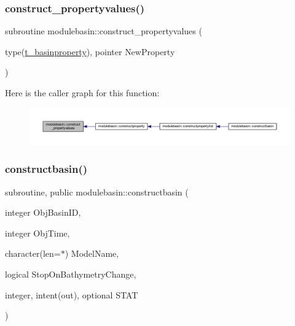 \subsubsection{\texorpdfstring{construct\+\_\+propertyvalues()}{construct\_propertyvalues()}}
{\footnotesize\ttfamily subroutine modulebasin\+::construct\+\_\+propertyvalues (\begin{DoxyParamCaption}\item[{type(\mbox{\hyperlink{structmodulebasin_1_1t__basinproperty}{t\+\_\+basinproperty}}), pointer}]{New\+Property }\end{DoxyParamCaption})\hspace{0.3cm}{\ttfamily [private]}}

Here is the caller graph for this function\+:\nopagebreak
\begin{figure}[H]
\begin{center}
\leavevmode
\includegraphics[width=350pt]{namespacemodulebasin_a65271cf9b17250a778002a527ee4c253_icgraph}
\end{center}
\end{figure}
\mbox{\label{namespacemodulebasin_a51d97ade316802f4f499db0fb3835e3f}} 
\subsubsection{\texorpdfstring{constructbasin()}{constructbasin()}}
{\footnotesize\ttfamily subroutine, public modulebasin\+::constructbasin (\begin{DoxyParamCaption}\item[{integer}]{Obj\+Basin\+ID,  }\item[{integer}]{Obj\+Time,  }\item[{character(len=$\ast$)}]{Model\+Name,  }\item[{logical}]{Stop\+On\+Bathymetry\+Change,  }\item[{integer, intent(out), optional}]{S\+T\+AT }\end{DoxyParamCaption})}


